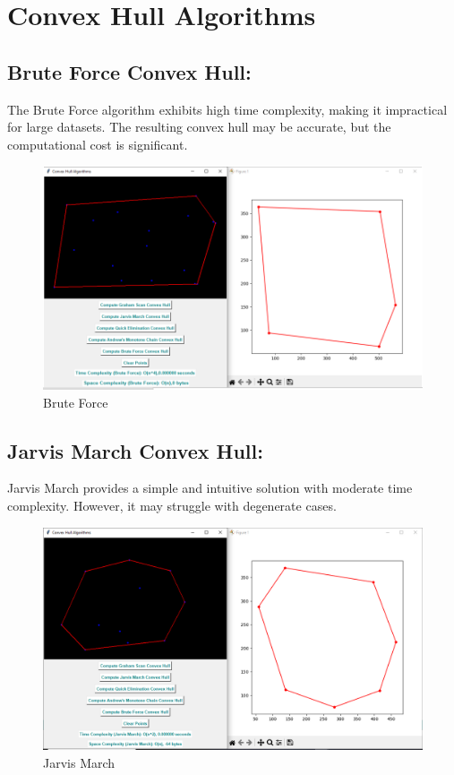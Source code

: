 \section{Convex Hull Algorithms}

\subsection{\textbf{Brute Force Convex Hull:}}

The Brute Force algorithm exhibits high time complexity, making it impractical for large datasets. The resulting convex hull may be accurate, but the computational cost is significant.

\begin{figure}[h]
    \centering
    \includegraphics[width=1\linewidth]{bruteforce imsge.PNG}
    \caption{Brute Force}
    \label{fig:bruteforce}
\end{figure}

\vspace{10pt} 

\subsection{\textbf{Jarvis March Convex Hull:}}

Jarvis March provides a simple and intuitive solution with moderate time complexity. However, it may struggle with degenerate cases.

\begin{figure}[h]
    \centering
    \includegraphics[width=1\linewidth]{jarvis.PNG}
    \caption{Jarvis March}
    \label{fig:jarvis}
\end{figure}

